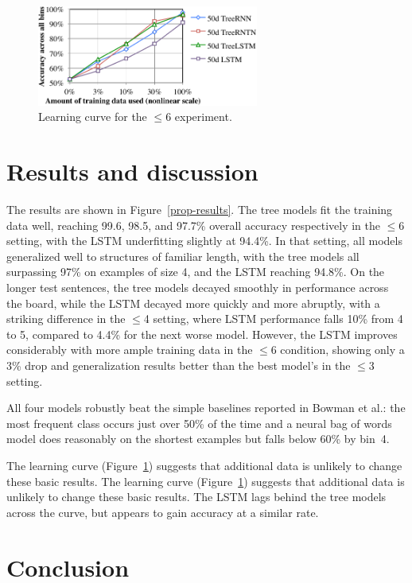 \begin{figure}[t]
  \centering
      \includegraphics[height=1.3in]{lcc.pdf}
  \caption{Learning curve for the $\le$6 experiment.}
  \label{fig:lc} 
\end{figure}

\section{Results and discussion}\label{sec:discussion}

The results are shown in Figure~\ref{prop-results}. 
The tree models fit the training data well, reaching 99.6, 98.5, and 97.7\% overall accuracy respectively in the $\le$6 setting, with the LSTM underfitting slightly at 94.4\%. 
In that setting, all models generalized well to structures of familiar length, with the tree models all surpassing 97\% on examples of size 4, and the LSTM reaching 94.8\%.
On the longer test sentences, the tree models decayed smoothly in performance across the board, while the LSTM decayed more quickly and more abruptly, with a striking difference in the $\le$4 setting, where LSTM performance falls 10\% from 4 to 5, compared to 4.4\% for the next worse model. However, the LSTM improves considerably with more ample training data in the $\le$6 condition, showing only a 3\% drop and generalization results better than the best model's in the $\le$3 setting.

All four models robustly beat the simple baselines reported in Bowman et al.: the most frequent class occurs just over 50\% of the time and a neural bag of words model does reasonably on the shortest examples but falls below 60\% by bin~4.

The learning curve (Figure~\ref{fig:lc}) suggests that additional data is unlikely to change these basic results. The learning curve (Figure~\ref{fig:lc}) suggests that additional data is unlikely to change these basic results. The LSTM lags behind the tree models across the curve, but appears to gain accuracy at a similar rate.

\section{Conclusion}

